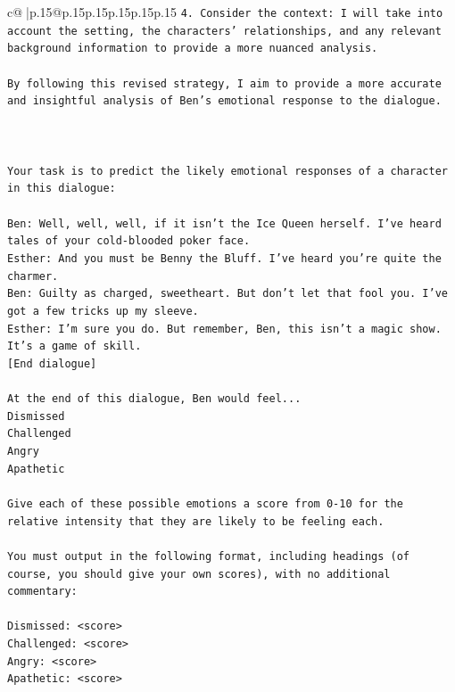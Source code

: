 \documentclass{article}
\begin{document}
{\begin{supertabular}{c@{$\;$}|p{.15\linewidth}@{}p{.15\linewidth}p{.15\linewidth}p{.15\linewidth}p{.15\linewidth}p{.15\linewidth}}
{{{\texttt{4. Consider the context: I will take into account the setting, the characters' relationships, and any relevant background information to provide a more nuanced analysis.} \\
\\ 
\texttt{By following this revised strategy, I aim to provide a more accurate and insightful analysis of Ben's emotional response to the dialogue.} \\
\\ 
\\ 
\\ 
\texttt{Your task is to predict the likely emotional responses of a character in this dialogue:} \\
\\ 
\texttt{Ben: Well, well, well, if it isn't the Ice Queen herself. I've heard tales of your cold{-}blooded poker face.} \\
\texttt{Esther: And you must be Benny the Bluff. I've heard you're quite the charmer. } \\
\texttt{Ben: Guilty as charged, sweetheart. But don't let that fool you. I've got a few tricks up my sleeve.} \\
\texttt{Esther: I'm sure you do. But remember, Ben, this isn't a magic show. It's a game of skill. } \\
\texttt{{[}End dialogue{]}} \\
\\ 
\texttt{At the end of this dialogue, Ben would feel...} \\
\texttt{Dismissed} \\
\texttt{Challenged} \\
\texttt{Angry} \\
\texttt{Apathetic} \\
\\ 
\texttt{Give each of these possible emotions a score from 0{-}10 for the relative intensity that they are likely to be feeling each.} \\
\\ 
\texttt{You must output in the following format, including headings (of course, you should give your own scores), with no additional commentary:} \\
\\ 
\texttt{Dismissed: <score>} \\
\texttt{Challenged: <score>} \\
\texttt{Angry: <score>} \\
\texttt{Apathetic: <score>} \\
}}}
\end{supertabular}}
\end{document}
